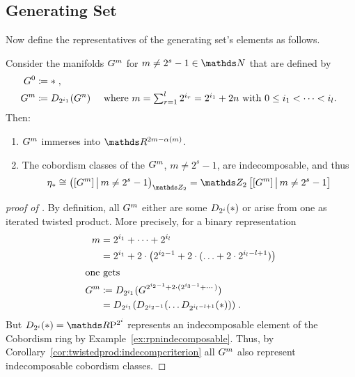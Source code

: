 \subsection{Generating Set}
Now define the representatives of the generating set's elements as follows.
\begin{Thm}\label{thm:brownproof}
  Consider the manifolds $G^{m}$ for $m\neq 2^s-1\in\Nat$ that are
  defined by
  \begin{align*}
    G^{0} &\coloneqq * \;, \\
    G^{m} &\coloneqq D_{2^{i_1}}({G^{n}})
        &\text{
          where
          $\textstyle m=\sum_{r=1}^l 2^{i_r}=2^{i_1}+2n$
          with $0\leq i_1<\dotsb<i_l$.
          }
  \end{align*}
  Then:
  \begin{enumerate}
  \item\label{item:brownimmersionproperty}
    $G^{m}$ immerses into $\R^{2m-\alpha(m)}$.
  \item\label{item:indecomposabilityproperty}
    The cobordism classes of the $G^{m}$, $m\neq 2^s-1$, are
    indecomposable, and thus
    \begin{gather*}
      \c_*\cong \left( [\G m] \,\big|\, m\neq 2^s-1 \right)_{\Zmod2}
      = \Zmod2\left[[\G m] \,\big|\, m\neq 2^s-1\right]
    \end{gather*}
  \end{enumerate}
\end{Thm}
\begin{proof}[proof of
  ]
  By definition, all $G^{m}$ either are some $D_{2^i}({*})$
  or arise from one as iterated twisted product. More precisely, for a binary
  representation
  \begin{align*}
    m &= 2^{i_1}+\dotsb + 2^{i_l} \\
      &= 2^{i_1}+ 2\cdot\big( 2^{i_2-1} + 2\cdot(\dotsc + 2\cdot 2^{i_l-l+1})\big)
    \\\intertext{one gets}
    G^{m} &\coloneqq
           D_{2^{i_1}}({G^{2^{i_2-1} + 2\cdot(2^{i_3-1}+\dotsb)}})\\
      &= D_{2^{i_1}}({
        D_{2^{i_2-1}}({
        \dotsc
        D_{2^{i_l-l+1}}({*})
        })})
        \;.
  \end{align*}
  But $\Twistedprod{2^{i}}{\pt}=\RP{2^i}$ represents an indecomposable
  element of the Cobordism ring by Example~\autoref{ex:rpnindecomposable}.
  Thus, by Corollary~\autoref{cor:twistedprod:indecompcriterion} all
  $G^{m}$ also represent indecomposable cobordism classes.
\end{proof}
